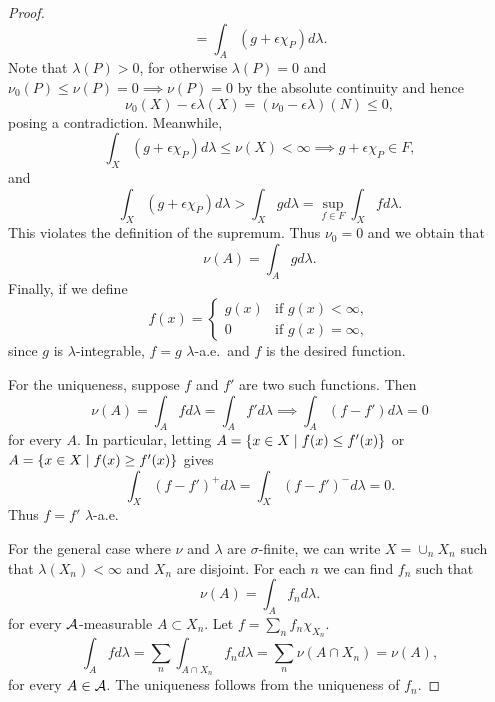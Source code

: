 \begin{proof}
\begin{equation*}
        = \int_A (g+\epsilon\chi_P)d\lambda.
    \end{equation*}
    Note that $\lambda(P)>0$, for otherwise $\lambda(P) = 0$ 
    and $\nu_0(P)\leq\nu(P) = 0\implies\nu(P) = 0$ by the 
    absolute continuity and hence 
    \begin{equation*}
        \nu_0(X) - \epsilon\lambda(X) = (\nu_0-\epsilon\lambda)(N) \leq 0,
    \end{equation*}
    posing a contradiction. Meanwhile, 
    \begin{equation*}
        \int_X (g+\epsilon\chi_P)d\lambda \leq \nu(X) < \infty 
        \implies g+\epsilon\chi_P\in F,
    \end{equation*}
    and 
    \begin{equation*}
        \int_X (g+\epsilon\chi_P)d\lambda > \int_X gd\lambda 
        = \sup_{f\in F}\int_X fd\lambda.
    \end{equation*}
    This violates the definition of the supremum. Thus $\nu_0 = 0$ 
    and we obtain that 
    \begin{equation*}
        \nu(A) = \int_A gd\lambda.
    \end{equation*}
    Finally, if we define 
    \begin{equation*}
        f(x) = \begin{cases}
            g(x) & \text{if } g(x) < \infty, \\
            0 & \text{if } g(x) = \infty,
        \end{cases}
    \end{equation*}
    since $g$ is $\lambda$-integrable, $f = g$ $\lambda$-a.e.\
    and $f$ is the desired function. 

    For the uniqueness, suppose $f$ and $f'$ are two such functions. 
    Then 
    \begin{equation*}
        \nu(A) = \int_A fd\lambda = \int_A f'd\lambda \implies 
        \int_A (f-f')d\lambda = 0
    \end{equation*}
    for every $A$. In particular, letting $A = \left\{ x\in X \;\middle\vert\; f(x)\leq f'(x) \right\}$ 
    or $A = \left\{ x\in X \;\middle\vert\; f(x)\geq f'(x) \right\}$ gives 
    \begin{equation*}
        \int_X (f-f')^+d\lambda = \int_X (f-f')^-d\lambda = 0.
    \end{equation*}
    Thus $f = f'$ $\lambda$-a.e. 

    For the general case where $\nu$ and $\lambda$ are $\sigma$-finite, 
    we can write $X = \cup_n X_n$ such that $\lambda(X_n)<\infty$ 
    and $X_n$ are disjoint. For each $n$ we can find $f_n$ such that 
    \begin{equation*}
        \nu(A) = \int_{A} f_nd\lambda.
    \end{equation*}
    for every $\mathcal{A}$-measurable $A\subset X_n$. Let $f = \sum_n f_n\chi_{X_n}$. 
    \begin{equation*}
        \int_A fd\lambda = \sum_n \int_{A\cap X_n} f_nd\lambda 
        = \sum_n \nu(A\cap X_n) = \nu(A),
    \end{equation*}
    for every $A\in\mathcal{A}$. The uniqueness follows from the uniqueness 
    of $f_n$.
\end{proof}
